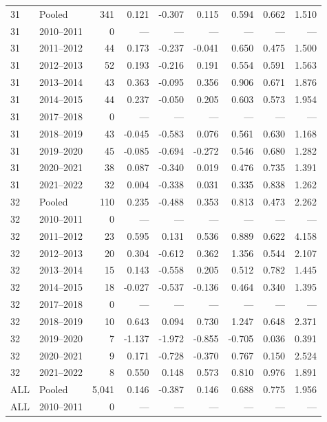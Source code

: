 \begin{longtable}{llrrrrrrr}
31 & Pooled & 341 & 0.121 & -0.307 & 0.115 & 0.594 & 0.662 & 1.510 \\
31 & 2010--2011 & 0 & --- & --- & --- & --- & --- & --- \\
31 & 2011--2012 & 44 & 0.173 & -0.237 & -0.041 & 0.650 & 0.475 & 1.500 \\
31 & 2012--2013 & 52 & 0.193 & -0.216 & 0.191 & 0.554 & 0.591 & 1.563 \\
31 & 2013--2014 & 43 & 0.363 & -0.095 & 0.356 & 0.906 & 0.671 & 1.876 \\
31 & 2014--2015 & 44 & 0.237 & -0.050 & 0.205 & 0.603 & 0.573 & 1.954 \\
31 & 2017--2018 & 0 & --- & --- & --- & --- & --- & --- \\
31 & 2018--2019 & 43 & -0.045 & -0.583 & 0.076 & 0.561 & 0.630 & 1.168 \\
31 & 2019--2020 & 45 & -0.085 & -0.694 & -0.272 & 0.546 & 0.680 & 1.282 \\
31 & 2020--2021 & 38 & 0.087 & -0.340 & 0.019 & 0.476 & 0.735 & 1.391 \\
31 & 2021--2022 & 32 & 0.004 & -0.338 & 0.031 & 0.335 & 0.838 & 1.262 \\
32 & Pooled & 110 & 0.235 & -0.488 & 0.353 & 0.813 & 0.473 & 2.262 \\
32 & 2010--2011 & 0 & --- & --- & --- & --- & --- & --- \\
32 & 2011--2012 & 23 & 0.595 & 0.131 & 0.536 & 0.889 & 0.622 & 4.158 \\
32 & 2012--2013 & 20 & 0.304 & -0.612 & 0.362 & 1.356 & 0.544 & 2.107 \\
32 & 2013--2014 & 15 & 0.143 & -0.558 & 0.205 & 0.512 & 0.782 & 1.445 \\
32 & 2014--2015 & 18 & -0.027 & -0.537 & -0.136 & 0.464 & 0.340 & 1.395 \\
32 & 2017--2018 & 0 & --- & --- & --- & --- & --- & --- \\
32 & 2018--2019 & 10 & 0.643 & 0.094 & 0.730 & 1.247 & 0.648 & 2.371 \\
32 & 2019--2020 & 7 & -1.137 & -1.972 & -0.855 & -0.705 & 0.036 & 0.391 \\
32 & 2020--2021 & 9 & 0.171 & -0.728 & -0.370 & 0.767 & 0.150 & 2.524 \\
32 & 2021--2022 & 8 & 0.550 & 0.148 & 0.573 & 0.810 & 0.976 & 1.891 \\
ALL & Pooled & 5,041 & 0.146 & -0.387 & 0.146 & 0.688 & 0.775 & 1.956 \\
ALL & 2010--2011 & 0 & --- & --- & --- & --- & --- & --- \\

\end{longtable}
